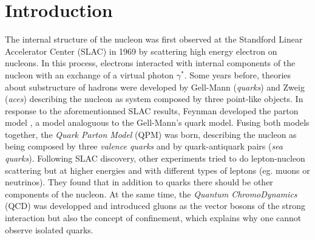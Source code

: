 
\chapter*{Introduction} %

\label{ch:intro} %


The internal structure of the nucleon was first observed at the Standford Linear Accelerator Center (SLAC) in 1969 \cite{SLAC} by scattering high energy electron on nucleons. In this process, electrons interacted with internal components of the nucleon with an exchange of a virtual photon $\gamma^*$. Some years before, theories about substructure of hadrons were developed by Gell-Mann (\textit{quarks}) \cite{Gellman} and Zweig (\textit{aces}) \cite{Zweig} describing the nucleon as system composed by three point-like objects. In response to the aforementionned SLAC results, Feynman developed the parton model \cite{PartonModel}, a model analoguous to the Gell-Mann's quark model. Fusing both models together, the \textit{Quark Parton Model} (QPM) was born, describing the nucleon as being composed by three \textit{valence quarks} and by quark-antiquark pairs (\textit{sea quarks}). Following SLAC discovery, other experiments tried to do lepton-nucleon scattering but at higher energies and with different types of leptons (eg. muons or neutrinos). They found that in addition to quarks there should be other components of the nucleon. At the same time, the \textit{Quantum ChromoDynamics} (QCD) was developped and introduced gluons as the vector bosons of the strong interaction but also the concept of confinement, which explains why one cannot observe isolated quarks.

